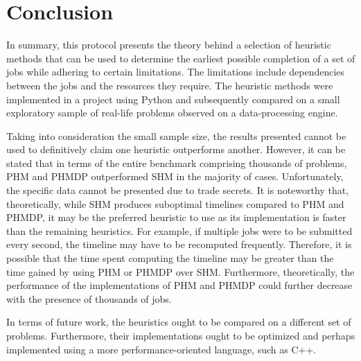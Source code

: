 \clearpage
\section{Conclusion}
In summary, this protocol presents the theory behind a selection of heuristic methods that can be used to determine the earliest possible completion of a set of jobs while adhering to certain limitations. The limitations include dependencies between the jobs and the resources they require.
The heuristic methods were implemented in a project using Python and subsequently compared on a small exploratory sample of real-life problems observed on a data-processing engine.

Taking into consideration the small sample size, the results presented cannot be used to definitively claim one heuristic outperforms another.
However, it can be stated that in terms of the entire benchmark comprising thousands of problems, PHM and PHMDP outperformed SHM in the majority of cases.
Unfortunately, the specific data cannot be presented due to trade secrets.
It is noteworthy that, theoretically, while SHM produces suboptimal timelines compared to PHM and PHMDP, it may be the preferred heuristic to use as its implementation is faster than the remaining heuristics.
For example, if multiple jobs were to be submitted every second, the timeline may have to be recomputed frequently.
Therefore, it is possible that the time spent computing the timeline may be greater than the time gained by using PHM or PHMDP over SHM.
Furthermore, theoretically, the performance of the implementations of PHM and PHMDP could further decrease with the presence of thousands of jobs.

In terms of future work, the heuristics ought to be compared on a different set of problems.
Furthermore, their implementations ought to be optimized and perhaps implemented using a more performance-oriented language, such as C++.